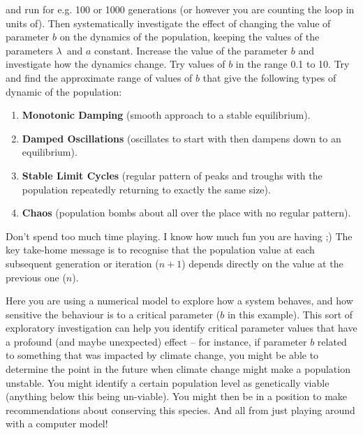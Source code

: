 \documentclass{tufte-book} %
\begin{document}
\noindent and run for e.g. 100 or 1000 generations (or however you are counting the loop in units of). Then systematically investigate the effect of changing the value of parameter \textit{\(b\)} on the dynamics of the population, keeping the values of the parameters \(\lambda\)\ and \textit{\(a\)} constant. Increase the value of the parameter \textit{\(b\)} and investigate how the dynamics change. Try values of \textit{\(b\)} in the range 0.1 to 10. Try and find the approximate range of values of \textit{\(b\)} that give the following types of dynamic of the population:

\begin{enumerate}[noitemsep]
\setlength{\itemindent}{.2in}
\item \textbf{Monotonic Damping} (smooth approach to a stable equilibrium).
\item \textbf{Damped Oscillations} (oscillates to start with then dampens down to an equilibrium).
\item\textbf{ Stable Limit Cycles} (regular pattern of peaks and troughs with the population repeatedly returning to exactly the same size).
\item \textbf{Chaos} (population bombs about all over the place with no regular pattern).
\end{enumerate}

\noindent Don't spend too much time playing. I know how much fun you are having ;) The key take-home message is to recognise that the population value at each subsequent generation or iteration (\(n+1\)) depends directly on the value at the previous one (\(n\)).

Here you are using a numerical model to explore how a system behaves, and how sensitive the behaviour is to a critical parameter (\textit{\(b\)} in this example). This sort of exploratory investigation can help you identify critical parameter values that have a profound (and maybe unexpected) effect -- for instance, if parameter \(b\) related to something that was impacted by climate change, you might be able to determine the point in the future when climate change might make a population unstable. You might identify a certain population level as genetically viable (anything below this being un-viable). You might then be in a position to make recommendations about conserving this species. And all from just playing around with a computer model!
\end{document}
